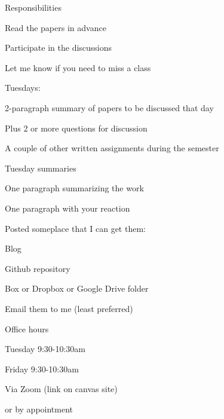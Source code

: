 \documentclass[aspectratio=169,12pt,t]{beamer}
\begin{document}
\begin{frame}{Responsibilities}

  \bbi
\item Read the papers in advance
\item Participate in the discussions
\item Let me know if you need to miss a class
\item Tuesdays:
  \bi
  \item 2-paragraph summary of papers to be discussed that day
  \item Plus 2 or more questions for discussion
  \ei
\item A couple of other written assignments during the semester
  \ei

\end{frame}



\begin{frame}{Tuesday summaries}

  \bbi
\item One paragraph summarizing the work
\item One paragraph with your reaction
\item Posted someplace that I can get them:
  \bi
\item Blog
\item Github repository
\item Box or Dropbox or Google Drive folder
\item Email them to me (least preferred)
  \ei
\ei

\end{frame}


\begin{frame}{Office hours}

  \bbi
\item Tuesday 9:30-10:30am
\item Friday 9:30-10:30am
\item Via Zoom (link on canvas site)
\item \hilit or by appointment
\ei

\end{frame}
\end{document}
